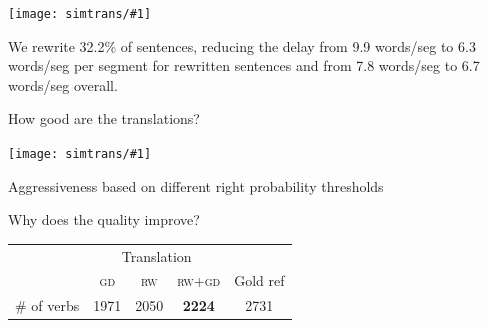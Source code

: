 \documentclass[compress]{beamer}
\newcommand{\abr}[1]{\textsc{#1} }
\newcommand{\gfxs}[2]{
\begin{center}
	\texttt{[image: simtrans/\#1]}
\end{center}
}
\begin{document}
\begin{frame}{}

\gfxs{rewrite_eval}{.8}
\pause
We rewrite 32.2\% of
sentences, reducing the delay from 9.9 words/seg to 6.3 words/seg per
segment for rewritten sentences and from 7.8 words/seg to 6.7 words/seg overall.

\end{frame}

\begin{frame}{How good are the translations?}

  \gfxs{tradeoff-rw-bleu}{.7}

\begin{center}
Aggressiveness based on different right probability thresholds
\cite{fujita-13}
\end{center}

\end{frame}

\begin{frame}{Why does the quality improve?}

\begin{center}
\begin{tabular}{ccccc}
\toprule
& \multicolumn{3}{c}{Translation} & \\
\cmidrule{2-4}
& \abr{gd} & \abr{rw} & \abr{rw+gd} & Gold ref \\
\midrule
\# of verbs & 1971 & 2050 & {\bf 2224} & 2731 \\
\bottomrule
\end{tabular}
\end{center}

\end{frame}
\end{document}
